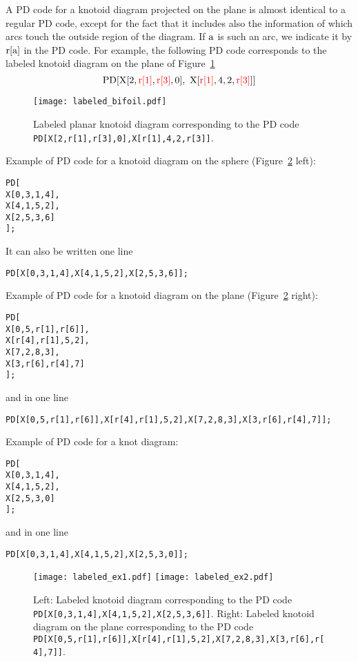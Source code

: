 A PD code for a knotoid diagram projected on the plane is almost identical to a regular PD code, except for the fact that it includes also the information of which arcs touch the outside region of the diagram. If ${\rm a}$ is such an arc, we indicate it by ${\rm r[a]}$ in the PD code. For example, the following PD code corresponds to the labeled knotoid diagram on the plane of Figure~\ref{fig:labbif}
\[
{\rm PD [ X[2, {\color{red} r[1]}, {\color{red}r[3]}, 0 ] , \ X[{\color{red}r[1]},4,2,{\color{red}r[3]}] ] }
\]

\begin{figure}[t]
\centering
\texttt{[image: labeled\_bifoil.pdf]}
\caption{Labeled planar knotoid diagram corresponding to the PD code \lstinline{PD[X[2,r[1],r[3],0],X[r[1],4,2,r[3]]}.}\label{fig:labbif}
\end{figure}


Example of PD code for a knotoid diagram on the sphere (Figure~\ref{fig:labexamples} left):
\begin{lstlisting}
PD[
X[0,3,1,4],
X[4,1,5,2],
X[2,5,3,6]
];
\end{lstlisting}
It can also be written one line
\begin{lstlisting}
PD[X[0,3,1,4],X[4,1,5,2],X[2,5,3,6]];
\end{lstlisting}
Example of PD code for a knotoid diagram on the plane  (Figure~\ref{fig:labexamples} right):
\begin{lstlisting}
PD[
X[0,5,r[1],r[6]],
X[r[4],r[1],5,2],
X[7,2,8,3],
X[3,r[6],r[4],7]
];
\end{lstlisting}
and in one line
\begin{lstlisting}
PD[X[0,5,r[1],r[6]],X[r[4],r[1],5,2],X[7,2,8,3],X[3,r[6],r[4],7]];
\end{lstlisting}
Example of PD code for a knot diagram:
\begin{lstlisting}
PD[
X[0,3,1,4],
X[4,1,5,2],
X[2,5,3,0]
];
\end{lstlisting}
and in one line
\begin{lstlisting}
PD[X[0,3,1,4],X[4,1,5,2],X[2,5,3,0]];
\end{lstlisting}
\begin{figure}[t]
\centering
\texttt{[image: labeled\_ex1.pdf]}
\hspace*{2cm}
\texttt{[image: labeled\_ex2.pdf]}
\caption{Left: Labeled knotoid diagram corresponding to the PD code \lstinline{PD[X[0,3,1,4],X[4,1,5,2],X[2,5,3,6]]}. Right: Labeled knotoid diagram on the plane corresponding to the PD code \lstinline{PD[X[0,5,r[1],r[6]],X[r[4],r[1],5,2],X[7,2,8,3],X[3,r[6],r[4],7]]}.}\label{fig:labexamples}
\end{figure}

